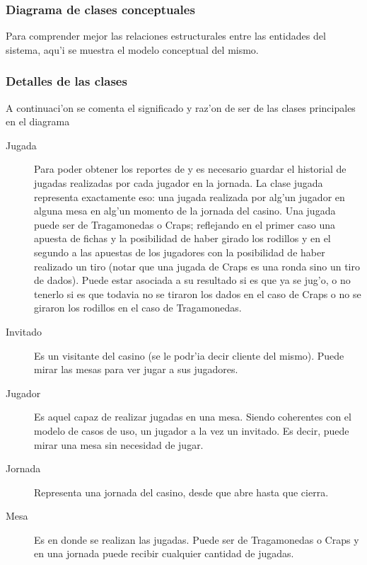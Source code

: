\subsubsection{Diagrama de clases conceptuales}
Para comprender mejor las relaciones estructurales entre las entidades del sistema, aqu'i se muestra el modelo conceptual del mismo. 



\subsubsection{Detalles de las clases}
A continuaci'on se comenta el significado y raz'on de ser de las clases principales en el diagrama
\begin{description}
\item [Jugada] Para poder obtener los reportes de  y  es necesario guardar el historial de jugadas realizadas por cada jugador en la jornada. La clase jugada representa exactamente eso: una jugada realizada por alg'un jugador en alguna mesa en alg'un momento de la jornada del casino. Una jugada puede ser de Tragamonedas o Craps; reflejando en el primer caso una apuesta de fichas y la posibilidad de haber girado los rodillos y en el segundo a las apuestas de los jugadores con la posibilidad de haber realizado un tiro (notar que una jugada de Craps  es una ronda sino un tiro de dados). Puede estar asociada a su resultado si es que ya se jug'o, o no tenerlo si es que todavia no se tiraron los dados en el caso de Craps o no se giraron los rodillos en el caso de Tragamonedas. 
\item [Invitado] Es un visitante del casino (se le podr'ia decir cliente del mismo). Puede mirar las mesas para ver jugar a sus jugadores.
\item [Jugador] Es aquel capaz de realizar jugadas en una mesa. Siendo coherentes con el modelo de casos de uso, un jugador  a la vez un invitado. Es decir, puede mirar una mesa sin necesidad de jugar.
\item [Jornada] Representa una jornada del casino, desde que abre hasta que cierra.
\item [Mesa] Es en donde se realizan las jugadas. Puede ser de Tragamonedas o Craps y en una jornada puede recibir cualquier cantidad de jugadas.
\end{description}


